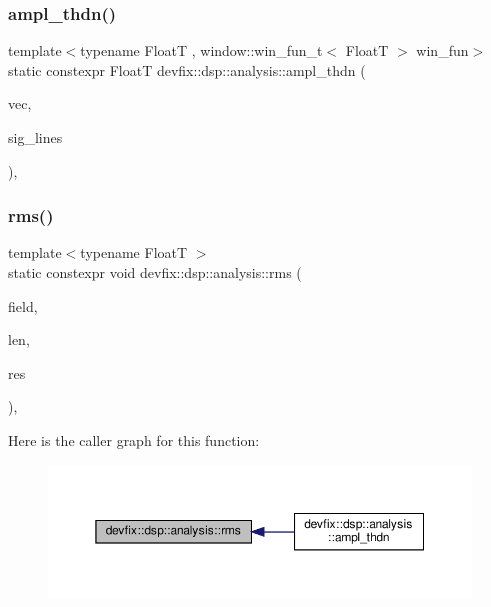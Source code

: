 \subsubsection{\texorpdfstring{ampl\+\_\+thdn()}{ampl\_thdn()}\hspace{0.1cm}{\footnotesize\ttfamily [2/2]}}
{\footnotesize\ttfamily template$<$typename FloatT , window\+::win\+\_\+fun\+\_\+t$<$ Float\+T $>$ win\+\_\+fun$>$ \\
static constexpr FloatT devfix\+::dsp\+::analysis\+::ampl\+\_\+thdn (\begin{DoxyParamCaption}\item[{std\+::vector$<$ std\+::complex$<$ FloatT $>$$>$}]{vec,  }\item[{const std\+::vector$<$ std\+::size\+\_\+t $>$ \&}]{sig\+\_\+lines }\end{DoxyParamCaption})\hspace{0.3cm}{\ttfamily [inline]}, {\ttfamily [static]}}

\mbox{\label{structdevfix_1_1dsp_1_1analysis_aee4afbd42b3519c1827b49b21042ee37}} 
\subsubsection{\texorpdfstring{rms()}{rms()}\hspace{0.1cm}{\footnotesize\ttfamily [1/3]}}
{\footnotesize\ttfamily template$<$typename FloatT $>$ \\
static constexpr void devfix\+::dsp\+::analysis\+::rms (\begin{DoxyParamCaption}\item[{const std\+::complex$<$ FloatT $>$ $\ast$}]{field,  }\item[{std\+::size\+\_\+t}]{len,  }\item[{FloatT $\ast$}]{res }\end{DoxyParamCaption})\hspace{0.3cm}{\ttfamily [inline]}, {\ttfamily [static]}}

Here is the caller graph for this function\+:\nopagebreak
\begin{figure}[H]
\begin{center}
\leavevmode
\includegraphics[width=350pt]{structdevfix_1_1dsp_1_1analysis_aee4afbd42b3519c1827b49b21042ee37_icgraph}
\end{center}
\end{figure}
\mbox{\label{structdevfix_1_1dsp_1_1analysis_a415630d073c18ee5ab1e270ee3845500}} 
